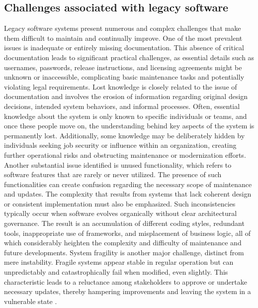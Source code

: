 \subsection{Challenges associated with legacy software}

Legacy software systems present numerous and complex challenges that make them difficult to maintain and continually improve.
One of the most prevalent issues is inadequate or entirely missing documentation.
This absence of critical documentation leads to significant practical challenges, as essential details such as usernames, passwords, release instructions, and licensing agreements might be unknown or inaccessible, complicating basic maintenance tasks and potentially violating legal requirements.
Lost knowledge is closely related to the issue of documentation and involves the erosion of information regarding original design decisions, intended system behaviors, and informal processes.
Often, essential knowledge about the system is only known to specific individuals or teams, and once these people move on, the understanding behind key aspects of the system is permanently lost.
Additionally, some knowledge may be deliberately hidden by individuals seeking job security or influence within an organization, creating further operational risks and obstructing maintenance or modernization efforts.
Another substantial issue identified is unused functionality, which refers to software features that are rarely or never utilized.
The presence of such functionalities can create confusion regarding the necessary scope of maintenance and updates.
The complexity that results from systems that lack coherent design or consistent implementation must also be emphasized.
Such inconsistencies typically occur when software evolves organically without clear architectural governance.
The result is an accumulation of different coding styles, redundant tools, inappropriate use of frameworks, and misplacement of business logic, all of which considerably heighten the complexity and difficulty of maintenance and future developments.
System fragility is another major challenge, distinct from mere instability.
Fragile systems appear stable in regular operation but can unpredictably and catastrophically fail when modified, even slightly.
This characteristic leads to a reluctance among stakeholders to approve or undertake necessary updates, thereby hampering improvements and leaving the system in a vulnerable state \citep{annettWorkingLegacySystems2019}.

